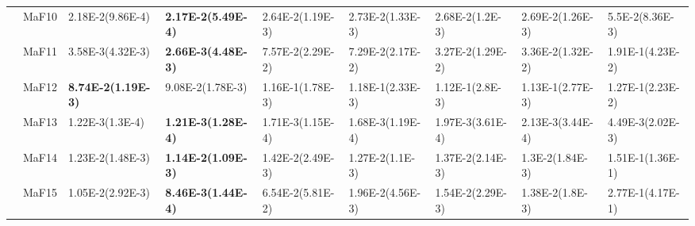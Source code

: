 \documentclass[]{article}
\begin{document}
\begin{landscape}
\begin{table}
\begin{footnotesize}
\begin{tabular}{|l|l|l|l|l|l|l|l|l|}
 & MaF10 & \cellcolor{gray95} 2.18E-2(9.86E-4) & \cellcolor{gray95} {\bf 2.17E-2(5.49E-4)} & 2.64E-2(1.19E-3) & 2.73E-2(1.33E-3) & 2.68E-2(1.2E-3) & 2.69E-2(1.26E-3) & 5.5E-2(8.36E-3)\\
 & MaF11 & \cellcolor{gray95} 3.58E-3(4.32E-3) & \cellcolor{gray95} {\bf 2.66E-3(4.48E-3)} & 7.57E-2(2.29E-2) & 7.29E-2(2.17E-2) & 3.27E-2(1.29E-2) & 3.36E-2(1.32E-2) & 1.91E-1(4.23E-2)\\
 & MaF12 & \cellcolor{gray95} {\bf 8.74E-2(1.19E-3)} & \cellcolor{gray95} 9.08E-2(1.78E-3) & 1.16E-1(1.78E-3) & 1.18E-1(2.33E-3) & 1.12E-1(2.8E-3) & 1.13E-1(2.77E-3) & 1.27E-1(2.23E-2)\\
 & MaF13 & \cellcolor{gray95} 1.22E-3(1.3E-4) & \cellcolor{gray95} {\bf 1.21E-3(1.28E-4)} & 1.71E-3(1.15E-4) & 1.68E-3(1.19E-4) & 1.97E-3(3.61E-4) & 2.13E-3(3.44E-4) & 4.49E-3(2.02E-3)\\
 & MaF14 & \cellcolor{gray95} 1.23E-2(1.48E-3) & \cellcolor{gray95} {\bf 1.14E-2(1.09E-3)} & 1.42E-2(2.49E-3) & \cellcolor{gray95} 1.27E-2(1.1E-3) & 1.37E-2(2.14E-3) & \cellcolor{gray95} 1.3E-2(1.84E-3) & 1.51E-1(1.36E-1)\\
 & MaF15 & \cellcolor{gray95} 1.05E-2(2.92E-3) & \cellcolor{gray95} {\bf 8.46E-3(1.44E-4)} & 6.54E-2(5.81E-2) & 1.96E-2(4.56E-3) & 1.54E-2(2.29E-3) & \cellcolor{gray95} 1.38E-2(1.8E-3) & 2.77E-1(4.17E-1)\\
\hline
\end{tabular}
\end{footnotesize}
\end{table}
\end{landscape}
\end{document}
